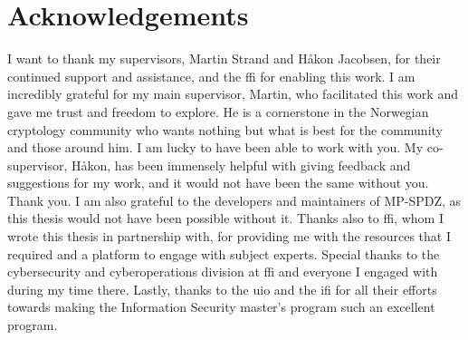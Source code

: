 \chapter*{Acknowledgements}

I want to thank my supervisors, Martin Strand and Håkon Jacobsen, for their continued support and assistance, and the \acrfull{ffi} for enabling this work. I am incredibly grateful for my main supervisor, Martin, who facilitated this work and gave me trust and freedom to explore. He is a cornerstone in the Norwegian cryptology community who wants nothing but what is best for the community and those around him. I am lucky to have been able to work with you. My co-supervisor, Håkon, has been immensely helpful with giving feedback and suggestions for my work, and it would not have been the same without you. Thank you. I am also grateful to the developers and maintainers of MP-SPDZ, as this thesis would not have been possible without it. Thanks also to \acrshort{ffi}, whom I wrote this thesis in partnership with, for providing me with the resources that I required and a platform to engage with subject experts. Special thanks to the cybersecurity and cyberoperations division at \acrshort{ffi} and everyone I engaged with during my time there. Lastly, thanks to the \acrfull{uio} and the \acrfull{ifi} for all their efforts towards making the Information Security master's program such an excellent program.
